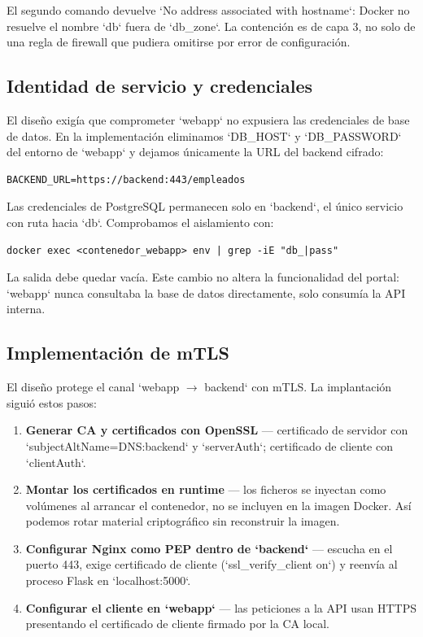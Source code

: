 \documentclass[11pt,spanish,listoffigures,listoftables]{tfgetsinf}
\begin{document}
        El segundo comando devuelve `No address associated with hostname`: Docker no resuelve el nombre `db` fuera de `db\_zone`. La contención es de capa 3, no solo de una regla de firewall que pudiera omitirse por error de configuración.
        
        \subsection{Identidad de servicio y credenciales}
        El diseño exigía que comprometer `webapp` no expusiera las credenciales de base de datos. En la implementación eliminamos `DB\_HOST` y `DB\_PASSWORD` del entorno de `webapp` y dejamos únicamente la URL del backend cifrado:
        
        \begin{lstlisting}
BACKEND_URL=https://backend:443/empleados
        \end{lstlisting}
        
        Las credenciales de PostgreSQL permanecen solo en `backend`, el único servicio con ruta hacia `db`. Comprobamos el aislamiento con:
        
        \begin{lstlisting}
docker exec <contenedor_webapp> env | grep -iE "db_|pass"
        \end{lstlisting}
        
        La salida debe quedar vacía. Este cambio no altera la funcionalidad del portal: `webapp` nunca consultaba la base de datos directamente, solo consumía la API interna.
        
        \subsection{Implementación de mTLS}
        El diseño protege el canal `webapp $\rightarrow$ backend` con mTLS. La implantación siguió estos pasos:
        \begin{enumerate}
            \item \textbf{Generar CA y certificados con OpenSSL} — certificado de servidor con `subjectAltName=DNS:backend` y `serverAuth`; certificado de cliente con `clientAuth`.
            \item \textbf{Montar los certificados en runtime} — los ficheros se inyectan como volúmenes al arrancar el contenedor, no se incluyen en la imagen Docker. Así podemos rotar material criptográfico sin reconstruir la imagen.
            \item \textbf{Configurar Nginx como PEP dentro de `backend`} — escucha en el puerto 443, exige certificado de cliente (`ssl\_verify\_client on`) y reenvía al proceso Flask en `localhost:5000`.
            \item \textbf{Configurar el cliente en `webapp`} — las peticiones a la API usan HTTPS presentando el certificado de cliente firmado por la CA local.
        \end{enumerate}
        
\end{document}
